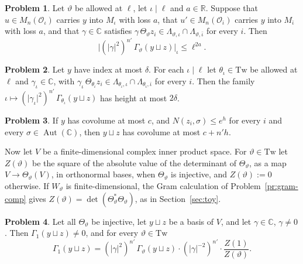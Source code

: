 \documentclass[reqno]{amsart}
\theoremstyle{definition}
\newtheorem{problem}{Problem}[section]
\theoremstyle{plain}
\theoremstyle{remark}
\newcommand{\R}{\mathbb{R}}
\newcommand{\C}{\mathbb{C}}
\newcommand{\Oc}{\mathcal{O}}
\newcommand{\Aut}{\operatorname{Aut}}
\begin{document}
\begin{problem}\label{pr:complete}
Let \(\vartheta\) be allowed at \(\ell\), let \(\iota \mid \ell\) and \(a \in \R\).  Suppose that \(u \in M_n(\Oc_\iota)\) carries \(y\) into \(M_\iota\) with loss \(a\), that \(u' \in M_n(\Oc_{\bar\iota})\) carries \(y\) into \(M_{\bar\iota}\) with loss \(a\), and that \(\gamma \in \C\) satisfies \(\gamma\, \Theta_\vartheta z_i \in \Lambda_{\vartheta, \iota} \cap \Lambda_{\vartheta, \bar\iota}\) for every \(i\).  Then
\[
  \bigl\lvert (\lvert\gamma\rvert^2)^{n'}\, \Gamma_\vartheta(y \sqcup z) \bigr\rvert_\iota \le \ell^{2a} .
\]
\end{problem}

\begin{problem}\label{pr:index-height}
Let \(y\) have index at most \(\delta\).  For each \(\iota \mid \ell\) let \(\theta_\iota \in \mathrm{Tw}\) be allowed at \(\ell\) and \(\gamma_\iota \in \C\), with \(\gamma_\iota\, \Theta_{\theta_\iota} z_i \in \Lambda_{\theta_\iota, \iota} \cap \Lambda_{\theta_\iota, \bar\iota}\) for every \(i\).  Then the family \(\iota \mapsto (\lvert\gamma_\iota\rvert^2)^{n'}\, \Gamma_{\theta_\iota}(y \sqcup z)\) has height at most \(2\delta\).
\end{problem}

\begin{problem}\label{pr:fischer}
If \(y\) has covolume at most \(c\), and \(N(z_i, \sigma) \le e^{h}\) for every \(i\) and every \(\sigma \in \Aut(\C)\), then \(y \sqcup z\) has covolume at most \(c + n' h\).
\end{problem}

Now let \(V\) be a finite-dimensional complex inner product space.  For \(\vartheta \in \mathrm{Tw}\) let \(Z(\vartheta)\) be the square of the absolute value of the determinant of \(\Theta_\vartheta\), as a map \(V \to \Theta_\vartheta(V)\), in orthonormal bases, when \(\Theta_\vartheta\) is injective, and \(Z(\vartheta) := 0\) otherwise.  If \(W_\vartheta\) is finite-dimensional, the Gram calculation of Problem~\ref{pr:gram-comp} gives \(Z(\vartheta) = \det(\Theta_\vartheta^* \Theta_\vartheta)\), as in Section~\ref{sec:toy}.

\begin{problem}\label{pr:factor}
Let all \(\Theta_\vartheta\) be injective, let \(y \sqcup z\) be a basis of \(V\), and let \(\gamma \in \C\), \(\gamma \ne 0\).  Then \(\Gamma_1(y \sqcup z) \ne 0\), and for every \(\vartheta \in \mathrm{Tw}\)
\[
  \Gamma_1(y \sqcup z) = (\lvert\gamma\rvert^2)^{n'}\, \Gamma_\vartheta(y \sqcup z) \cdot (\lvert\gamma\rvert^{-2})^{n'} \cdot \frac{Z(1)}{Z(\vartheta)} .
\]
\end{problem}
\end{document}
